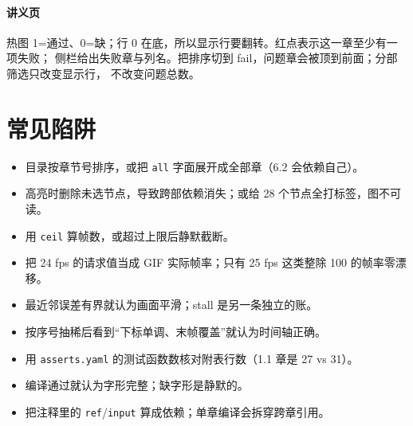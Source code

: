 \paragraph{讲义页}
热图 1=通过、0=缺；行 0 在底，所以显示行要翻转。红点表示这一章至少有一项失败；
侧栏给出失败章与列名。把排序切到 fail，问题章会被顶到前面；分部筛选只改变显示行，
不改变问题总数。

\section{常见陷阱}

\begin{itemize}
  \item 目录按章节号排序，或把 \texttt{all} 字面展开成全部章（6.2 会依赖自己）。
  \item 高亮时删除未选节点，导致跨部依赖消失；或给 28 个节点全打标签，图不可读。
  \item 用 \texttt{ceil} 算帧数，或超过上限后静默截断。
  \item 把 24 fps 的请求值当成 GIF 实际帧率；只有 25 fps 这类整除 100 的帧率零漂移。
  \item 最近邻误差有界就认为画面平滑；stall 是另一条独立的账。
  \item 按序号抽稀后看到“下标单调、末帧覆盖”就认为时间轴正确。
  \item 用 \texttt{asserts.yaml} 的测试函数数核对附表行数（1.1 章是 27 vs 31）。
  \item 编译通过就认为字形完整；缺字形是静默的。
  \item 把注释里的 \texttt{ref}/\texttt{input} 算成依赖；单章编译会拆穿跨章引用。
\end{itemize}


